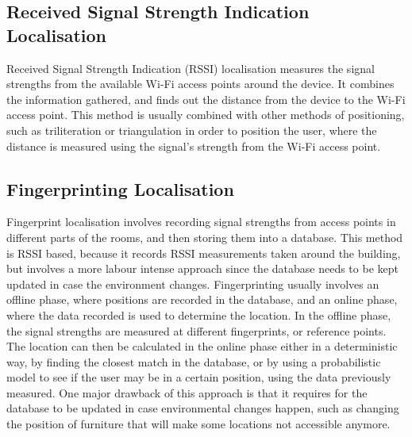 


\subsection{Received Signal Strength Indication Localisation}
Received Signal Strength Indication (RSSI) localisation measures the signal strengths from the available Wi-Fi access points around the device. It combines the information gathered, and finds out the distance from the device to the Wi-Fi access point. This method is usually combined with other methods of positioning, such as triliteration or triangulation in order to position the user, where the distance is measured using the signal's strength from the Wi-Fi access point.

\subsection{Fingerprinting Localisation}
\label{sec:fingerprinting-localisation}

Fingerprint localisation involves recording signal strengths from access points in different parts of the rooms, and then storing them into a database. This method is  RSSI based, because it records RSSI measurements taken around the building, but involves a more labour intense approach since the database needs to be kept updated in case the environment changes. Fingerprinting usually involves an offline phase, where positions are recorded in the database, and an online phase, where the data recorded is used to determine the location. In the offline phase, the signal strengths are measured at different fingerprints, or reference points. The location can then be calculated in the online phase  either in a deterministic way, by finding the closest match in the database, or by using a probabilistic model to see if the user may be in a certain position, using the data previously measured. One major drawback of this approach is that it requires for the database to be updated in case environmental changes happen, such as changing the position of furniture that will make some locations not accessible anymore. 

